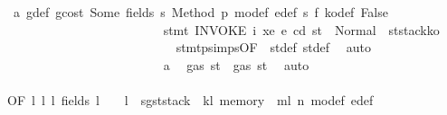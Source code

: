 \begin{isabellebody}
\ \ a{}\ g{\isacharunderscore}{\kern0pt}def\ gcost\ Some\ fields\ s{}\ Method\ p{}\ m\isactrlsub o{\isacharunderscore}{\kern0pt}def\ e{\isacharprime}{\kern0pt}{\isacharunderscore}{\kern0pt}def\ s{}\ f{}\ k\isactrlsub o{\isacharunderscore}{\kern0pt}def\ False\isanewline
\ \ \ \ \ \ \ \ \ \ \ \ \ \ \ \ \ \ \ \ \ \ \ \ \isamarkupfalse%
\ {\isachardoublequoteopen}stmt\ {\isacharparenleft}{\kern0pt}INVOKE\ i\ xe{\isacharparenright}{\kern0pt}\ e\ cd\ st\ {\isacharequal}{\kern0pt}\ Normal\ {\isacharparenleft}{\kern0pt}{\isacharparenleft}{\kern0pt}{\isacharparenright}{\kern0pt}{\isacharcomma}{\kern0pt}\ st{\isacharprime}{\kern0pt}{\isacharprime}{\kern0pt}{\isacharprime}{\kern0pt}{\isasymlparr}stack{\isacharcolon}{\kern0pt}{\isacharequal}{\kern0pt}k\isactrlsub o{\isasymrparr}{\isacharparenright}{\kern0pt}{\isachardoublequoteclose}\isanewline
\ \ \ \ \ \ \ \ \ \ \ \ \ \ \ \ \ \ \ \ \ \ \ \ \ \ \isamarkupfalse%
\ stmt{\isachardot}{\kern0pt}psimps{\isacharparenleft}{\kern0pt}{}{\isacharparenright}{\kern0pt}{\isacharbrackleft}{\kern0pt}OF\ {}{\isacharparenleft}{\kern0pt}{}{\isacharparenright}{\kern0pt}{\isacharbrackright}{\kern0pt}\ st{\isacharprime}{\kern0pt}{\isacharunderscore}{\kern0pt}def\ st{\isacharprime}{\kern0pt}{\isacharprime}{\kern0pt}{\isacharunderscore}{\kern0pt}def\ \isamarkupfalse%
\ auto\isanewline
\ \ \ \ \ \ \ \ \ \ \ \ \ \ \ \ \ \ \ \ \ \ \ \ \isamarkupfalse%
\ a{}\ \isamarkupfalse%
\ {\isachardoublequoteopen}gas\ st{}{\isacharprime}{\kern0pt}\ {\isasymle}\ gas\ st{\isacharprime}{\kern0pt}{\isacharprime}{\kern0pt}{\isacharprime}{\kern0pt}{\isachardoublequoteclose}\ \isamarkupfalse%
\ auto\isanewline
\ \ \ \ \ \ \ \ \ \ \ \ \ \ \ \ \ \ \ \ \ \ \ \ \isamarkupfalse%
\ \isamarkupfalse%
\ {}{\isacharparenleft}{\kern0pt}{}{\isacharparenright}{\kern0pt}{\isacharbrackleft}{\kern0pt}OF\ l{}\ l{}\ l{}\ fields\ l{}\ {\isacharunderscore}{\kern0pt}\ {\isacharunderscore}{\kern0pt}\ {\isacharunderscore}{\kern0pt}\ l{}{\isacharcomma}{\kern0pt}\ \ {\isacharquery}{\kern0pt}s{\isacharprime}{\kern0pt}g{\isacharequal}{\kern0pt}{\isachardoublequoteopen}st{\isacharprime}{\kern0pt}{\isacharprime}{\kern0pt}{\isasymlparr}stack\ {\isacharcolon}{\kern0pt}{\isacharequal}{\kern0pt}\ k\isactrlsub l{\isacharcomma}{\kern0pt}\ memory\ {\isacharcolon}{\kern0pt}{\isacharequal}{\kern0pt}\ m\isactrlsub l{\isasymrparr}{\isachardoublequoteclose}{\isacharbrackright}{\kern0pt}\ n{}\ m\isactrlsub o{\isacharunderscore}{\kern0pt}def\ e{\isacharprime}{\kern0pt}{\isacharunderscore}{\kern0pt}def\isanewline

\end{isabellebody}

